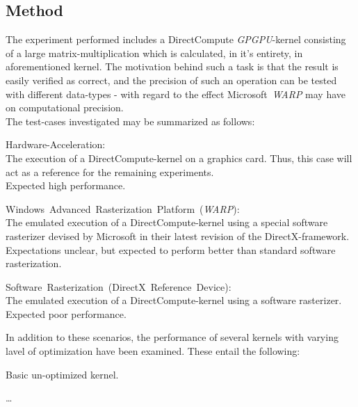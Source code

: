 \documentclass[fleqn,10pt]{SelfArx} %
\begin{document}
\subsection{Method}
\label{sec:contribution:method}
The experiment performed includes a DirectCompute \textit{GPGPU}-kernel consisting of a large matrix-multiplication which is calculated, in it’s entirety, in aforementioned kernel. The motivation behind such a task is that the result is easily verified as correct, and the precision of such an operation can be tested with different data-types - with regard to the effect Microsoft~\textit{WARP} may have on computational precision.\\
The test-cases investigated may be summarized as follows:
\begin{description*}
\item[Hardware-Acceleration:] \hfill \\
	The execution of a DirectCompute-kernel on a graphics card. Thus, this case will act as a reference for the remaining experiments.\\
	Expected high performance.
\item[Windows~Advanced~Rasterization~Platform~(\textit{WARP}):] \hfill \\
	The emulated execution of a DirectCompute-kernel using a special software rasterizer devised by Microsoft in their latest revision of the DirectX-framework.\\	
	Expectations unclear, but expected to perform better than standard software rasterization.
\item[Software~Rasterization~(DirectX~Reference~Device):] \hfill \\
	The emulated execution of a DirectCompute-kernel using a software rasterizer.\\
	Expected poor performance.
\end{description*}
In addition to these scenarios, the performance of several kernels with varying lavel of optimization have been examined. These entail the following:
\begin{enumerate*}
	\item Basic un-optimized kernel.
	\item \ldots
\end{enumerate*}
\end{document}
